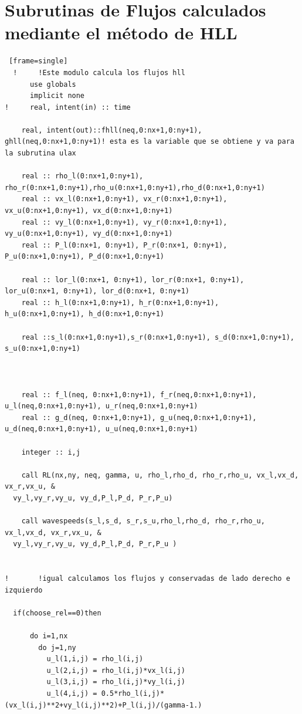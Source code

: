 \documentclass[12pt,a4paper]{book}
\begin{document}
\chapter{Subrutinas de Flujos calculados mediante el método de HLL}\label{ap_subrutina_fluxesHLL}
\begin{lstlisting} [frame=single]
  !     !Este modulo calcula los flujos hll
      use globals
      implicit none
!     real, intent(in) :: time
    
    real, intent(out)::fhll(neq,0:nx+1,0:ny+1), ghll(neq,0:nx+1,0:ny+1)! esta es la variable que se obtiene y va para la subrutina ulax

    real :: rho_l(0:nx+1,0:ny+1), rho_r(0:nx+1,0:ny+1),rho_u(0:nx+1,0:ny+1),rho_d(0:nx+1,0:ny+1)
    real :: vx_l(0:nx+1,0:ny+1), vx_r(0:nx+1,0:ny+1), vx_u(0:nx+1,0:ny+1), vx_d(0:nx+1,0:ny+1)
    real :: vy_l(0:nx+1,0:ny+1), vy_r(0:nx+1,0:ny+1), vy_u(0:nx+1,0:ny+1), vy_d(0:nx+1,0:ny+1)
    real :: P_l(0:nx+1, 0:ny+1), P_r(0:nx+1, 0:ny+1), P_u(0:nx+1,0:ny+1), P_d(0:nx+1,0:ny+1)

    real :: lor_l(0:nx+1, 0:ny+1), lor_r(0:nx+1, 0:ny+1), lor_u(0:nx+1, 0:ny+1), lor_d(0:nx+1, 0:ny+1)
    real :: h_l(0:nx+1,0:ny+1), h_r(0:nx+1,0:ny+1), h_u(0:nx+1,0:ny+1), h_d(0:nx+1,0:ny+1)

    real ::s_l(0:nx+1,0:ny+1),s_r(0:nx+1,0:ny+1), s_d(0:nx+1,0:ny+1), s_u(0:nx+1,0:ny+1)
    
    

    real :: f_l(neq, 0:nx+1,0:ny+1), f_r(neq,0:nx+1,0:ny+1), u_l(neq,0:nx+1,0:ny+1), u_r(neq,0:nx+1,0:ny+1)
    real :: g_d(neq, 0:nx+1,0:ny+1), g_u(neq,0:nx+1,0:ny+1), u_d(neq,0:nx+1,0:ny+1), u_u(neq,0:nx+1,0:ny+1)

    integer :: i,j

    call RL(nx,ny, neq, gamma, u, rho_l,rho_d, rho_r,rho_u, vx_l,vx_d, vx_r,vx_u, &
  vy_l,vy_r,vy_u, vy_d,P_l,P_d, P_r,P_u)

    call wavespeeds(s_l,s_d, s_r,s_u,rho_l,rho_d, rho_r,rho_u, vx_l,vx_d, vx_r,vx_u, &
  vy_l,vy_r,vy_u, vy_d,P_l,P_d, P_r,P_u )

    
!       !igual calculamos los flujos y conservadas de lado derecho e izquierdo

  if(choose_rel==0)then
  
      do i=1,nx
        do j=1,ny
          u_l(1,i,j) = rho_l(i,j)
          u_l(2,i,j) = rho_l(i,j)*vx_l(i,j)
          u_l(3,i,j) = rho_l(i,j)*vy_l(i,j)
          u_l(4,i,j) = 0.5*rho_l(i,j)*(vx_l(i,j)**2+vy_l(i,j)**2)+P_l(i,j)/(gamma-1.)


\end{lstlisting}
\end{document}
